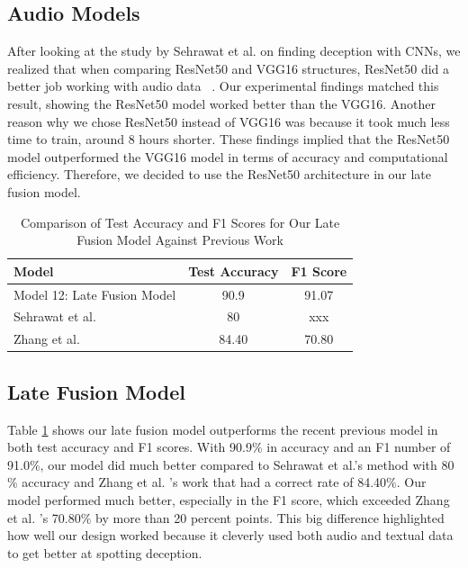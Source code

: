 \documentclass[12pt]{article}
\begin{document}
\subsection{Audio Models}
After looking at the study by Sehrawat et al. on finding deception with CNNs, we realized that when comparing ResNet50 and VGG16 structures, ResNet50 did a better job working with audio data ~\cite{sehrawat2023deception}. Our experimental findings matched this result, showing the ResNet50 model worked better than the VGG16. Another reason why we chose ResNet50 instead of VGG16 was because it took much less time to train, around 8 hours shorter. These findings implied that the ResNet50 model outperformed the VGG16 model in terms of accuracy and computational efficiency. Therefore, we decided to use the ResNet50 architecture in our late fusion model. 
\begin{table}[H]
\centering
\begin{tabular}{l c c}
\hline
\textbf{Model} & \textbf{Test Accuracy} & \textbf{F1 Score} \\
\hline
Model 12: Late Fusion Model & 90.9 & 91.07 \\
Sehrawat et al.~\cite{sehrawat2023deception}& 80 & xxx\\
Zhang et al.~\cite{zhang2022fine} & 84.40 & 70.80  \\
\hline
\end{tabular}
\caption{Comparison of Test Accuracy and F1 Scores for Our Late Fusion Model Against Previous Work}
\label{tab:myTab4}
\end{table}
  
\subsection{Late Fusion Model}  
Table \ref{tab:myTab4} shows our late fusion model outperforms the recent previous model in both test accuracy and F1 scores. With 90.9$\%$  in accuracy and an F1 number of 91.0$\%$, our model did much better compared to Sehrawat et al.'s method with 80$\%$  accuracy and Zhang et al. 's work that had a correct rate of 84.40$\%$. Our model performed much better, especially in the F1 score, which exceeded Zhang et al. 's 70.80$\%$  by more than 20 percent points. This big difference highlighted how well our design worked because it cleverly used both audio and textual data to get better at spotting deception.  
\end{document}
